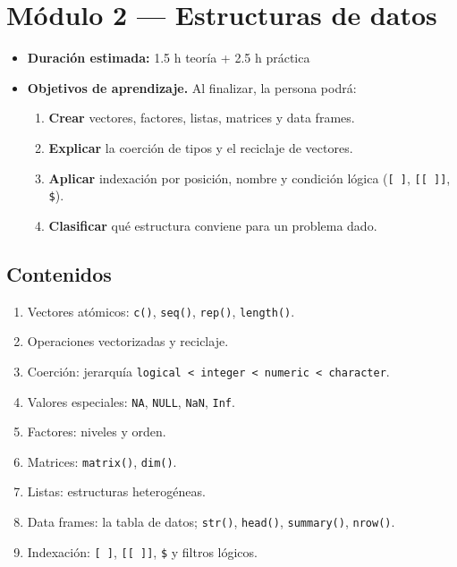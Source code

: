 \chapter{Módulo 2 --- Estructuras de datos}

\begin{itemize}
\tightlist
\item
  \textbf{Duración estimada:} 1.5 h teoría + 2.5 h práctica
\item
  \textbf{Objetivos de aprendizaje.} Al finalizar, la persona podrá:

  \begin{enumerate}
  \def\labelenumi{\arabic{enumi}.}
  \tightlist
  \item
    \textbf{Crear} vectores, factores, listas, matrices y data frames.
  \item
    \textbf{Explicar} la coerción de tipos y el reciclaje de vectores.
  \item
    \textbf{Aplicar} indexación por posición, nombre y condición lógica
    (\passthrough{\lstinline![ ]!}, \passthrough{\lstinline![[ ]]!},
    \passthrough{\lstinline!$!}).
  \item
    \textbf{Clasificar} qué estructura conviene para un problema dado.
  \end{enumerate}
\end{itemize}

\section{Contenidos}

\begin{enumerate}
\def\labelenumi{\arabic{enumi}.}
\tightlist
\item
  Vectores atómicos: \passthrough{\lstinline!c()!},
  \passthrough{\lstinline!seq()!}, \passthrough{\lstinline!rep()!},
  \passthrough{\lstinline!length()!}.
\item
  Operaciones vectorizadas y reciclaje.
\item
  Coerción: jerarquía
  \passthrough{\lstinline!logical < integer < numeric < character!}.
\item
  Valores especiales: \passthrough{\lstinline!NA!},
  \passthrough{\lstinline!NULL!}, \passthrough{\lstinline!NaN!},
  \passthrough{\lstinline!Inf!}.
\item
  Factores: niveles y orden.
\item
  Matrices: \passthrough{\lstinline!matrix()!},
  \passthrough{\lstinline!dim()!}.
\item
  Listas: estructuras heterogéneas.
\item
  Data frames: la tabla de datos; \passthrough{\lstinline!str()!},
  \passthrough{\lstinline!head()!}, \passthrough{\lstinline!summary()!},
  \passthrough{\lstinline!nrow()!}.
\item
  Indexación: \passthrough{\lstinline![ ]!},
  \passthrough{\lstinline![[ ]]!}, \passthrough{\lstinline!$!} y filtros
  lógicos.
\end{enumerate}

